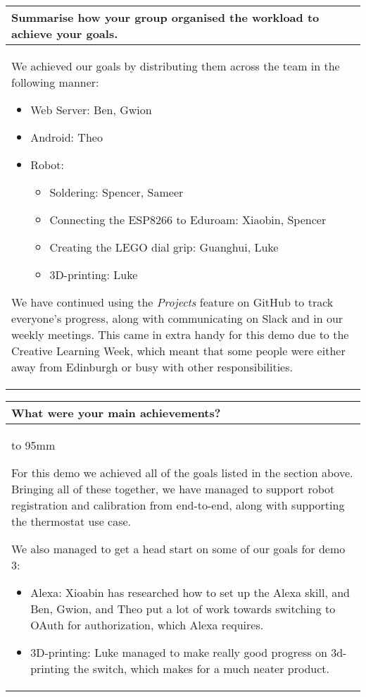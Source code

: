 \documentclass[a4paper]{article}
\newcommand{\colWidth}{141mm}
\begin{document}
\begin{center}
\begin{tabular}{|p{\colWidth}|}
	\hline
\end{tabular}
\vskip 5mm


\begin{tabular}{|p{\colWidth}|}
	\hline
	\cellcolor{blue!25}\large
	\textbf{Summarise how your group organised the workload to achieve your goals.}
	\\ \hline
	
		We achieved our goals by distributing them across the team in the following manner:
		\begin{itemize}
			\item Web Server: Ben, Gwion
			\item Android: Theo
			\item Robot:
			\begin{itemize}
				\item Soldering: Spencer, Sameer
				\item Connecting the ESP8266 to Eduroam: Xiaobin, Spencer
				\item Creating the LEGO dial grip: Guanghui, Luke
				\item 3D-printing: Luke
			\end{itemize}
		\end{itemize}

		We have continued using the \textit{Projects} feature on GitHub to track everyone's progress, along with communicating on Slack and in our weekly meetings.
		This came in extra handy for this demo due to the Creative Learning Week, which meant that some people were either away from Edinburgh or busy with other responsibilities.
	
  \\
  \hline
\end{tabular}
\vskip 5mm


\begin{tabular}{|p{\colWidth}|}
	\hline
	\cellcolor{blue!25}\large
	\textbf{What were your main achievements?}
	\\ \hline
	\vtop to 95mm{
		For this demo we achieved all of the goals listed in the section above. Bringing all of these together, we have
		managed to support robot registration and calibration from end-to-end, along with supporting the thermostat use case.

		\vspace{2mm}

		We also managed to get a head start on some of our goals for demo 3:
		\begin{itemize}
			\item Alexa: Xioabin has researched how to set up the Alexa skill, and Ben, Gwion, and Theo put a lot of work towards switching to OAuth for authorization, which Alexa requires.
			\item 3D-printing: Luke managed to make really good progress on 3d-printing the switch, which makes for a much neater product.
		\end{itemize}
	}
  \\
  \hline
\end{tabular}
\vskip 5mm


\end{center}
\end{document}
